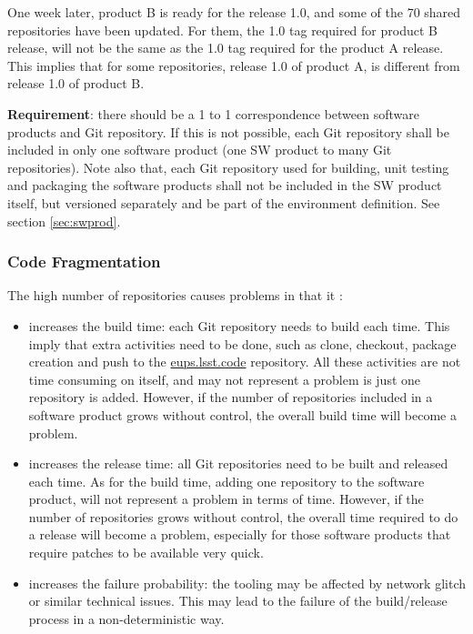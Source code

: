 One week later, product B is ready for the release 1.0, and some of the 70 shared repositories have been updated.
For them, the 1.0 tag required for product B release, will not be the same as the 1.0 tag required for the product A release.
This implies that for some repositories, release 1.0 of product A, is different from release 1.0 of product B.

\textbf{Requirement}: there should be a 1 to 1 correspondence between software products and Git repository. 
If this is not possible, each Git repository shall be included in only one software product (one SW product to many Git repositories).
Note also that, each Git repository used for building, unit testing and packaging the software products shall not be included in the SW product itself, but versioned separately and be part of the environment definition. See section \ref{sec:swprod}.


\subsubsection{Code Fragmentation} \label{sec:problemCode}

The high number of repositories causes problems in that it :

\begin{itemize}
\item increases the build time: each Git repository needs to build each time. 
This imply that extra activities need to be done, such as clone, checkout, package creation and push to the \url{eups.lsst.code} repository.
All these activities are not time consuming on itself, and may not represent a problem is just one repository is added.
However, if the number of repositories included in a software product grows without control, the overall build time will become a problem.
\item increases the release time: all Git repositories need to be built and released each time.
As for the build time, adding one repository to the software product, will not represent a problem in terms of time.
However, if the number of repositories grows without control, the overall time required to do a release will become a problem, especially for those software products that require patches to be available very quick.
\item increases the failure probability: the tooling may be affected by network glitch or similar technical issues. 
This may lead to the failure of the build/release process in a non-deterministic way.
\end{itemize}

